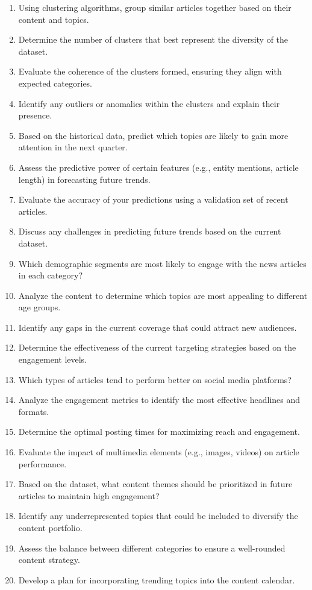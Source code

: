 \begin{footnotesize}
\begin{enumerate}[label={\(q_{\arabic*}\).},start=60]
\item Using clustering algorithms, group similar articles together based on their content and topics.
\item Determine the number of clusters that best represent the diversity of the dataset.
\item Evaluate the coherence of the clusters formed, ensuring they align with expected categories.
\item Identify any outliers or anomalies within the clusters and explain their presence.
\item Based on the historical data, predict which topics are likely to gain more attention in the next quarter.
\item Assess the predictive power of certain features (e.g., entity mentions, article length) in forecasting future trends.
\item Evaluate the accuracy of your predictions using a validation set of recent articles.
\item Discuss any challenges in predicting future trends based on the current dataset.
\item Which demographic segments are most likely to engage with the news articles in each category?
\item Analyze the content to determine which topics are most appealing to different age groups.
\item Identify any gaps in the current coverage that could attract new audiences.
\item Determine the effectiveness of the current targeting strategies based on the engagement levels.
\item Which types of articles tend to perform better on social media platforms?
\item Analyze the engagement metrics to identify the most effective headlines and formats.
\item Determine the optimal posting times for maximizing reach and engagement.
\item Evaluate the impact of multimedia elements (e.g., images, videos) on article performance.
\item Based on the dataset, what content themes should be prioritized in future articles to maintain high engagement?
\item Identify any underrepresented topics that could be included to diversify the content portfolio.
\item Assess the balance between different categories to ensure a well-rounded content strategy.
\item Develop a plan for incorporating trending topics into the content calendar.

\end{enumerate}
\end{footnotesize}
